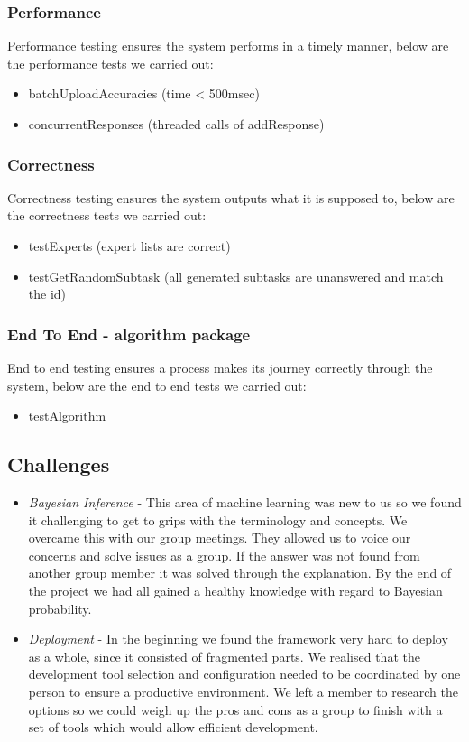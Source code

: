 \documentclass[11pt]{article}
\begin{document}
\subsubsection{Performance}
Performance testing ensures the system performs in a timely manner, below are the performance tests we carried out: 
\begin{itemize}
\item batchUploadAccuracies (time < 500msec)
\item concurrentResponses (threaded calls of addResponse)
\end{itemize}
\subsubsection{Correctness}
Correctness testing ensures the system outputs what it is supposed to, below are the correctness tests we carried out:
\begin{itemize}
\item testExperts (expert lists are correct)
\item testGetRandomSubtask (all generated subtasks are unanswered and match the id)
\end{itemize}
\subsubsection{End To End - algorithm package}
End to end testing ensures a process makes its journey correctly through the system, below are the end to end tests we carried out:
\begin{itemize}
\item testAlgorithm
\end{itemize}

\subsection{Challenges}

\begin{itemize}
\item \emph{Bayesian Inference} - This area of machine learning was new to us so we found it challenging to get to grips with the terminology and concepts. We overcame this with our group meetings. They allowed us to voice our concerns and solve issues as a group. If the answer was not found from another group member it was solved through the explanation. By the end of the project we had all gained a healthy knowledge with regard to Bayesian probability.

\item \emph{Deployment} - In the beginning we found the framework very hard to deploy as a whole, since it consisted of fragmented parts. We realised that the development tool selection and configuration needed to be coordinated by one person to ensure a productive environment. We left a member to research the options so we could weigh up the pros and cons as a group to finish with a set of tools which would allow efficient development.
\end{itemize}
\end{document}
